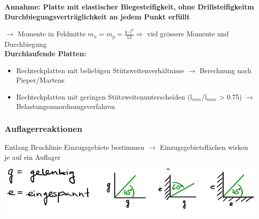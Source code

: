	\begin{minipage}{0.5\linewidth}
		
		\textbf{Annahme: Platte mit elastischer Biegesteifigkeit, ohne Drillsteifigkeitm Durchbiegungsverträglichkeit an jedem Punkt erfüllt}
		
		$ \rightarrow $ Momente in Feldmitte $ m_x = m_y = \frac{q \cdot l^2}{12} \Rightarrow $ viel grössere Momente und Durchbiegung \\
		
		\textbf{Durchlaufende Platten:}
			\begin{itemize}
						
				\item Rechteckplatten mit beliebigen Stützweitenverhältnisse $ \rightarrow $ Berechnung nach Pieper/Martens
				
				\item Rechteckplatten mit geringen Stützweitenunterscheiden (l$_{min}$/l$_{max}$ > 0.75) $ \rightarrow $ Belastungsumordnungsverfahren
				
			\end{itemize}
		
		\subsubsection{Auflagerreaktionen}
		
		Entlang Bruchlinie Einzugsgebiete bestimmen $ \rightarrow $ Einzugsgebietsflächen wirken je auf ein Auflager
		
		\includegraphics[width=\linewidth]{images/DW7Auflagerreaktion.PNG}
		
	\end{minipage}

